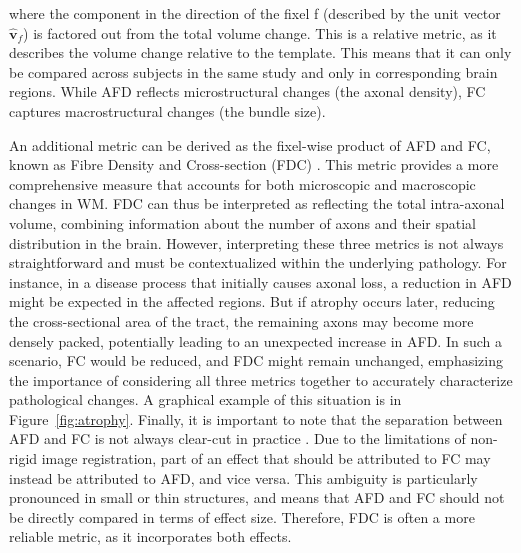 where the component in the direction of the fixel f (described by the unit vector $\hat{\boldsymbol v}_f$) is factored out from the total volume change.
This is a relative metric, as it describes the volume change relative to the template. This means that it can only be compared across subjects in the same study and only in corresponding brain regions.
While AFD reflects microstructural changes (the axonal density), FC captures macrostructural changes (the bundle size).

An additional metric can be derived as the fixel-wise product of AFD and FC, known as Fibre Density and Cross-section (FDC) \cite{Raffelt2017}. This metric provides a more comprehensive measure that accounts for both microscopic and macroscopic changes in WM. FDC can thus be interpreted as reflecting the total intra-axonal volume, combining information about the number of axons and their spatial distribution in the brain.
However, interpreting these three metrics is not always straightforward and must be contextualized within the underlying pathology. For instance, in a disease process that initially causes axonal loss, a reduction in AFD might be expected in the affected regions. But if atrophy occurs later, reducing the cross-sectional area of the tract, the remaining axons may become more densely packed, potentially leading to an unexpected increase in AFD. In such a scenario, FC would be reduced, and FDC might remain unchanged, emphasizing the importance of considering all three metrics together to accurately characterize pathological changes. A graphical example of this situation is in Figure~\ref{fig:atrophy}.
Finally, it is important to note that the separation between AFD and FC is not always clear-cut in practice \cite{Dhollander2021}. Due to the limitations of non-rigid image registration, part of an effect that should be attributed to FC may instead be attributed to AFD, and vice versa. This ambiguity is particularly pronounced in small or thin structures, and means that AFD and FC should not be directly compared in terms of effect size. Therefore, FDC is often a more reliable metric, as it incorporates both effects.\\


